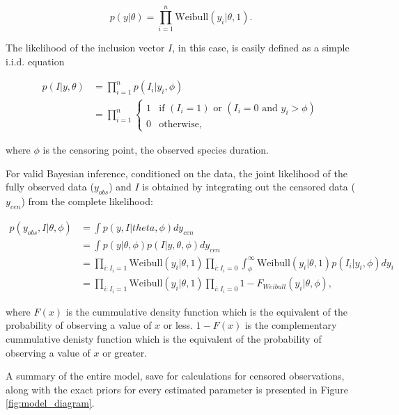 \documentclass[12pt,letterpaper]{article}
\begin{document}
\begin{equation}
  p(y | \theta) = \prod_{i = 1}^{n} \mathrm{Weibull}(y_{i}|\theta, 1).
\end{equation}

The likelihood of the inclusion vector \(I\), in this case, is easily defined as a simple i.i.d. equation

\begin{align*}
  p(I | y, \theta) &= \prod_{i = 1}^{n} p(I_{i} | y_{i}, \phi) \\
  &= \prod_{i = 1}^{n} 
    \begin{cases} 
      1 & \text{if } (I_{i} = 1) \text{ or } (I_{i} = 0 \text{ and } y_{i} > \phi) \\ 
      0 & \text{otherwise},
    \end{cases}
\end{align*}

where \(\phi\) is the censoring point, the observed species duration.

For valid Bayesian inference, conditioned on the data, the joint likelihood of the fully observed data (\(y_{obs}\)) and \(I\) is obtained by integrating out the censored data (\(y_{cen}\)) from the complete likelihood:

\begin{align*}
  p(y_{obs}, I | \theta, \phi) &= \int p(y, I | theta, \phi) dy_{cen} \\
  &= \int p(y | \theta, \phi) p(I | y, \theta, \phi) dy_{cen} \\
  &= \prod_{i: I_{i} = 1} \mathrm{Weibull}(y_{i} | \theta, 1) \prod_{i: I_{i} = 0} \int_{\phi}^{\infty} \mathrm{Weibull}(y_{i} | \theta, 1) p(I_{i} | y_{i}, \phi) dy_{i} \\
  &= \prod_{i: I_{i} = 1} \mathrm{Weibull}(y_{i} | \theta, 1) \prod_{i : I_{i} = 0} 1 - F_{Weibull}(y_{i} | \theta, \phi),
\end{align*}

where \(F(x)\) is the cummulative density function which is the equivalent of the probability of observing a value of \(x\) or less. \(1 - F(x)\) is the complementary cummulative denisty function which is the equivalent of the probability of observing a value of \(x\) or greater.


A summary of the entire model, save for calculations for censored observations, along with the exact priors for every estimated parameter is presented in Figure \ref{fig:model_diagram}.
\end{document}
